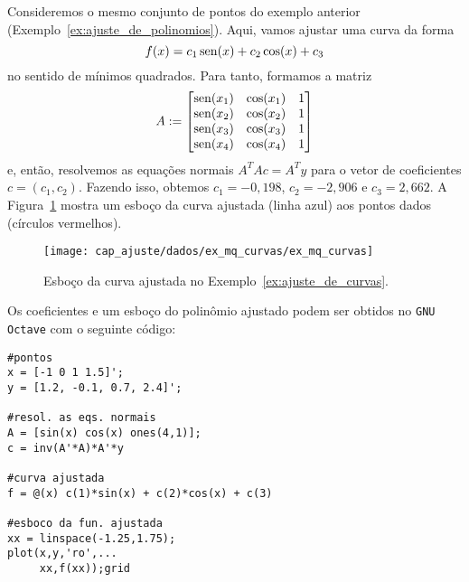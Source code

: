 \begin{ex}\label{ex:ajuste_de_curvas}
  Consideremos o mesmo conjunto de pontos do exemplo anterior (Exemplo~\ref{ex:ajuste_de_polinomios}). Aqui, vamos ajustar uma curva da forma
  \begin{equation}
    f(x) = c_1\operatorname{sen}(x) + c_2\cos(x) + c_3
  \end{equation}
no sentido de mínimos quadrados. Para tanto, formamos a matriz
\begin{equation}
  A :=
  \begin{bmatrix}
    \operatorname{sen}(x_1) & \cos(x_1) & 1 \\
    \operatorname{sen}(x_2) & \cos(x_2) & 1 \\
    \operatorname{sen}(x_3) & \cos(x_3) & 1 \\
    \operatorname{sen}(x_4) & \cos(x_4) & 1
  \end{bmatrix}
\end{equation}
  e, então, resolvemos as equações normais $A^TAc = A^Ty$ para o vetor de coeficientes $c=(c_1, c_2)$. Fazendo isso, obtemos $c_1=-0,198$, $c_2=-2,906$ e $c_3=2,662$. A Figura~\ref{fig:ex_ajuste_de_curvas} mostra um esboço da curva ajustada (linha azul) aos pontos dados (círculos vermelhos).

  \begin{figure}[h]
    \centering
    \texttt{[image: cap\_ajuste/dados/ex\_mq\_curvas/ex\_mq\_curvas]}
    \caption{Esboço da curva ajustada no Exemplo~\ref{ex:ajuste_de_curvas}.}
    \label{fig:ex_ajuste_de_curvas}
  \end{figure}

\ifisoctave
Os coeficientes e um esboço do polinômio ajustado podem ser obtidos no \verb+GNU Octave+ com o seguinte código:
\begin{verbatim}
#pontos
x = [-1 0 1 1.5]';
y = [1.2, -0.1, 0.7, 2.4]';

#resol. as eqs. normais
A = [sin(x) cos(x) ones(4,1)];
c = inv(A'*A)*A'*y

#curva ajustada
f = @(x) c(1)*sin(x) + c(2)*cos(x) + c(3)

#esboco da fun. ajustada
xx = linspace(-1.25,1.75);
plot(x,y,'ro',...
     xx,f(xx));grid
\end{verbatim}
\fi

\end{ex}

